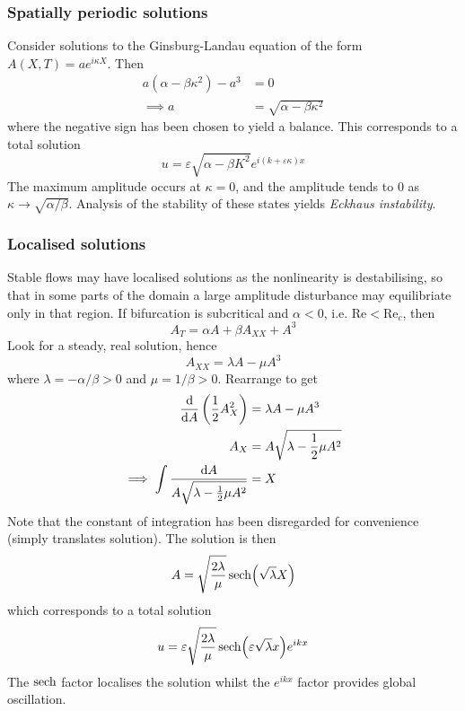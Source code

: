 \documentclass{jknotes}
\newcommand{\ReN}{\text{Re}}
\newcommand{\veps}{\varepsilon}
\begin{document}
\subsubsection{Spatially periodic solutions}
Consider solutions to the Ginsburg-Landau equation of the form $A(X,T) =
ae^{i\kappa X}$. Then
\begin{align}
	a(\alpha - \beta \kappa^2) - a^3 &= 0 \\
	\implies a &= \sqrt{\alpha - \beta \kappa^2}
\end{align}
where the negative sign has been chosen to yield a balance. This corresponds
to a total solution
\begin{equation}
	u = \veps \sqrt{\alpha - \beta K^2} e^{i(k+\veps \kappa)x}
\end{equation}
The maximum amplitude occurs at $\kappa=0$, and the amplitude tends to $0$ as
$\kappa \to \sqrt{\alpha/\beta}$. Analysis of the stability of these states
yields \emph{Eckhaus instability}.

\subsubsection{Localised solutions}
Stable flows may have localised solutions as the nonlinearity is
destabilising, so that in some parts of the domain a large amplitude
disturbance may equilibriate only in that region.  If bifurcation is
subcritical and $\alpha < 0$, i.e. $\ReN < \ReN_c$, then
\begin{equation}
	A_T = \alpha A + \beta A_{XX} + A^3
\end{equation}
Look for a steady, real solution, hence
\begin{equation}
	A_{XX} = \lambda A - \mu A^3
\end{equation}
where $\lambda = -\alpha/\beta > 0$ and $\mu = 1/\beta > 0$. Rearrange to get
\begin{align}
	\frac{\diffd}{\diffd A}\left(\frac{1}{2}A_{X}^2\right) &= \lambda A - \mu
	A^3 \\
	A_X &= A \sqrt{\lambda - \frac{1}{2}\mu A^2} \\
	\implies \int \frac{\diffd A}{A\sqrt{\lambda - \frac{1}{2}\mu A^2}} &= X
\end{align}
Note that the constant of integration has been disregarded for convenience
(simply translates solution).  The solution is then
\begin{equation}
	A = \sqrt{\frac{2\lambda}{\mu}} \sech(\sqrt{\lambda}X)
\end{equation}
which corresponds to a total solution
\begin{equation}
	u = \veps \sqrt{\frac{2\lambda}{\mu}} \sech (\veps \sqrt{\lambda}x)e^{ikx}
\end{equation}
The $\sech$ factor localises the solution whilst the $e^{ikx}$ factor provides
global oscillation.
\end{document}
